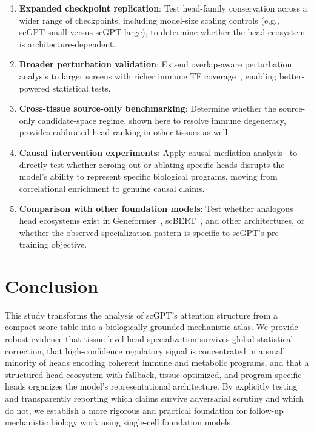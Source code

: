 \documentclass[11pt]{article}
\begin{document}
\begin{enumerate}
\item \textbf{Expanded checkpoint replication}: Test head-family conservation across a wider range of checkpoints, including model-size scaling controls (e.g., scGPT-small versus scGPT-large), to determine whether the head ecosystem is architecture-dependent.
\item \textbf{Broader perturbation validation}: Extend overlap-aware perturbation analysis to larger screens with richer immune TF coverage~\cite{replogle2022perturbseq}, enabling better-powered statistical tests.
\item \textbf{Cross-tissue source-only benchmarking}: Determine whether the source-only candidate-space regime, shown here to resolve immune degeneracy, provides calibrated head ranking in other tissues as well.
\item \textbf{Causal intervention experiments}: Apply causal mediation analysis~\cite{vig2020causal,geiger2021causal} to directly test whether zeroing out or ablating specific heads disrupts the model's ability to represent specific biological programs, moving from correlational enrichment to genuine causal claims.
\item \textbf{Comparison with other foundation models}: Test whether analogous head ecosystems exist in Geneformer~\cite{theodoris2023geneformer}, scBERT~\cite{yang2022scbert}, and other architectures, or whether the observed specialization pattern is specific to scGPT's pre-training objective.
\end{enumerate}


\section{Conclusion}

This study transforms the analysis of scGPT's attention structure from a compact score table into a biologically grounded mechanistic atlas. We provide robust evidence that tissue-level head specialization survives global statistical correction, that high-confidence regulatory signal is concentrated in a small minority of heads encoding coherent immune and metabolic programs, and that a structured head ecosystem with fallback, tissue-optimized, and program-specific heads organizes the model's representational architecture. By explicitly testing and transparently reporting which claims survive adversarial scrutiny and which do not, we establish a more rigorous and practical foundation for follow-up mechanistic biology work using single-cell foundation models.
\end{document}
